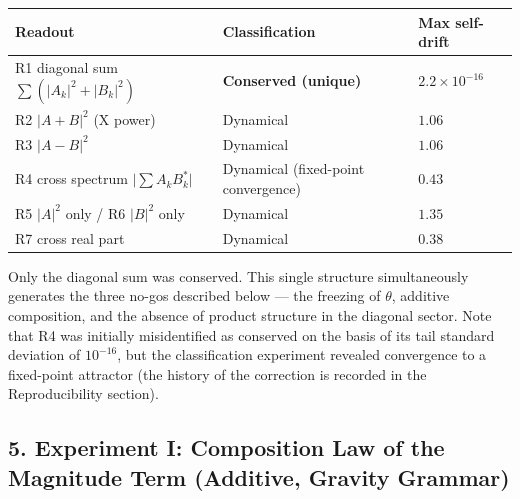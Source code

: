 \documentclass[
  a4paper,
]{article}
\newcounter{none} %
\begin{document}
{\def\LTcaptype{none} %
\begin{longtable}[]{@{}
  >{\raggedright\arraybackslash}p{}
  >{\raggedright\arraybackslash}p{}
  >{\raggedleft\arraybackslash}p{}@{}}
\toprule\noalign{}
\begin{minipage}[b]{\linewidth}\raggedright
Readout
\end{minipage} & \begin{minipage}[b]{\linewidth}\raggedright
Classification
\end{minipage} & \begin{minipage}[b]{\linewidth}\raggedleft
Max self-drift
\end{minipage} \\
\midrule\noalign{}
\endhead
\bottomrule\noalign{}
\endlastfoot
R1 diagonal sum \(\sum(\lvert A_k\rvert^2+\lvert B_k\rvert^2)\) &
\textbf{Conserved (unique)} & \(2.2\times10^{-16}\) \\
R2 \(\lvert A+B\rvert^2\) (X power) & Dynamical & \(1.06\) \\
R3 \(\lvert A-B\rvert^2\) & Dynamical & \(1.06\) \\
R4 cross spectrum \(\lvert\sum A_k B_k^*\rvert\) & Dynamical
(fixed-point convergence) & \(0.43\) \\
R5 \(\lvert A\rvert^2\) only / R6 \(\lvert B\rvert^2\) only & Dynamical
& \(1.35\) \\
R7 cross real part & Dynamical & \(0.38\) \\
\end{longtable}
}

Only the diagonal sum was conserved. This single structure
simultaneously generates the three no-gos described below --- the
freezing of \(\theta\), additive composition, and the absence of product
structure in the diagonal sector. Note that R4 was initially
misidentified as conserved on the basis of its tail standard deviation
of \(10^{-16}\), but the classification experiment revealed convergence
to a fixed-point attractor (the history of the correction is recorded in
the Reproducibility section).

\subsection{5. Experiment I: Composition Law of the Magnitude Term
(Additive, Gravity
Grammar)}\label{experiment-i-composition-law-of-the-magnitude-term-additive-gravity-grammar}
\end{document}
